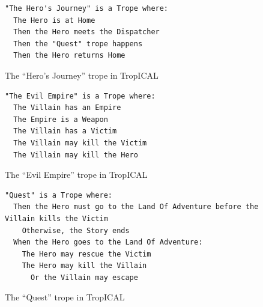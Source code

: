 \documentclass[11pt]{report}
\begin{document}
\begin{figure}[!t]
\begin{lstlisting}
"The Hero's Journey" is a Trope where:
  The Hero is at Home
  Then the Hero meets the Dispatcher
  Then the "Quest" trope happens
  Then the Hero returns Home
\end{lstlisting}%
\caption{The ``Hero's Journey'' trope in TropICAL\label{lst:hero}}
\medskip
\begin{lstlisting}
"The Evil Empire" is a Trope where:
  The Villain has an Empire
  The Empire is a Weapon
  The Villain has a Victim
  The Villain may kill the Victim
  The Villain may kill the Hero
\end{lstlisting}%
\caption{The ``Evil Empire'' trope in TropICAL\label{lst:evil}}
\medskip
\begin{lstlisting}
"Quest" is a Trope where:
  Then the Hero must go to the Land Of Adventure before the Villain kills the Victim
    Otherwise, the Story ends
  When the Hero goes to the Land Of Adventure:
    The Hero may rescue the Victim
    The Hero may kill the Villain
      Or the Villain may escape
\end{lstlisting}
\caption{The ``Quest'' trope in TropICAL\label{lst:quest}}
\end{figure}
\end{document}
